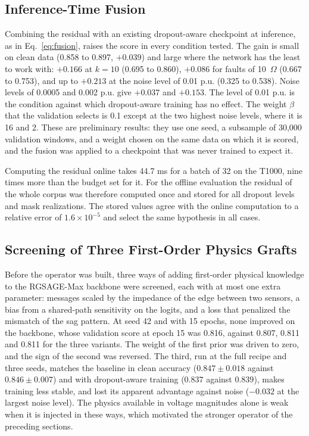 \documentclass[MTech]{ugthesis}
\begin{document}
\subsection{Inference-Time Fusion}

Combining the residual with an existing dropout-aware checkpoint at inference, as in Eq.~\eqref{eq:fusion}, raises the score in every condition tested. The gain is small on clean data (0.858 to 0.897, $+0.039$) and large where the network has the least to work with: $+0.166$ at $k=10$ (0.695 to 0.860), $+0.086$ for faults of 10~$\Omega$ (0.667 to 0.753), and up to $+0.213$ at the noise level of 0.01 p.u. (0.325 to 0.538). Noise levels of 0.0005 and 0.002 p.u. give $+0.037$ and $+0.153$. The level of 0.01 p.u. is the condition against which dropout-aware training has no effect. The weight $\beta$ that the validation selects is 0.1 except at the two highest noise levels, where it is 16 and 2. These are preliminary results: they use one seed, a subsample of 30,000 validation windows, and a weight chosen on the same data on which it is scored, and the fusion was applied to a checkpoint that was never trained to expect it.


Computing the residual online takes 44.7 ms for a batch of 32 on the T1000, nine times more than the budget set for it. For the offline evaluation the residual of the whole corpus was therefore computed once and stored for all dropout levels and mask realizations. The stored values agree with the online computation to a relative error of $1.6\times10^{-5}$ and select the same hypothesis in all cases.

\subsection{Screening of Three First-Order Physics Grafts}

Before the operator was built, three ways of adding first-order physical knowledge to the RGSAGE-Max backbone were screened, each with at most one extra parameter: messages scaled by the impedance of the edge between two sensors, a bias from a shared-path sensitivity on the logits, and a loss that penalized the mismatch of the sag pattern. At seed 42 and with 15 epochs, none improved on the backbone, whose validation score at epoch 15 was 0.816, against 0.807, 0.811 and 0.811 for the three variants. The weight of the first prior was driven to zero, and the sign of the second was reversed. The third, run at the full recipe and three seeds, matches the baseline in clean accuracy ($0.847\pm0.018$ against $0.846\pm0.007$) and with dropout-aware training ($0.837$ against $0.839$), makes training less stable, and lost its apparent advantage against noise ($-0.032$ at the largest noise level). The physics available in voltage magnitudes alone is weak when it is injected in these ways, which motivated the stronger operator of the preceding sections.
\end{document}
